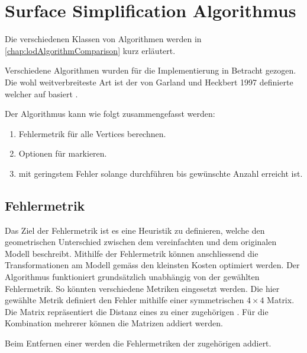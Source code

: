 \section{Surface Simplification Algorithmus}
\label{chap:surfaceSimplificationAlgorithm}
Die verschiedenen Klassen von Algorithmen werden in \autoref{chap:lodAlgorithmComparison} kurz erläutert.

Verschiedene Algorithmen wurden für die Implementierung in Betracht gezogen. Die wohl weitverbreiteste Art ist der von Garland und Heckbert 1997 definierte  welcher auf  basiert \cite{surfaceSimplificationUsingQuadricErrorMetrices, surfaceSimplificationWithColorUsingQuadricErrorMetrices}.

Der Algorithmus kann wie folgt zusammengefasst werden:

\begin{enumerate}
  \item Fehlermetrik für alle Vertices berechnen.
  \item Optionen für  markieren.
  \item {} mit geringstem Fehler solange durchführen bis gewünschte Anzahl  erreicht ist.
\end{enumerate}

\subsection{Fehlermetrik}
Das Ziel der Fehlermetrik ist es eine Heuristik zu definieren, welche den geometrischen Unterschied zwischen dem vereinfachten und dem originalen Modell beschreibt.
Mithilfe der Fehlermetrik können anschliessend die Transformationen am Modell gemäss den kleinsten Kosten optimiert werden. Der Algorithmus funktioniert grundsätzlich unabhängig von der gewählten Fehlermetrik. So könnten verschiedene Metriken eingesetzt werden.
Die hier gewählte Metrik definiert den Fehler mithilfe einer symmetrischen $4\times 4$ Matrix. Die Matrix repräsentiert die Distanz eines  zu einer zugehörigen . Für die Kombination mehrerer  können die Matrizen addiert werden.

Beim Entfernen einer  werden die Fehlermetriken der zugehörigen  addiert.

